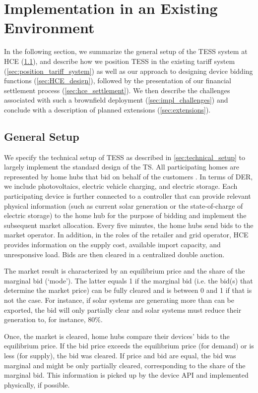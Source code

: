 \section{Implementation in an Existing Environment}\label{sec:challenges}

In the following section, we summarize the general setup of the TESS system at HCE (\cref{sec:hce_market_setup}), and describe how we position TESS in the existing tariff system (\cref{sec:position_tariff_system}) as well as our approach to designing device bidding functions (\cref{sec:HCE_design}), followed by the presentation of our financial settlement process (\cref{sec:hce_settlement}). We then describe the challenges associated with such a brownfield deployment (\cref{sec:impl_challenges}) and conclude with a description of planned extensions (\cref{sec:extensions}).

\subsection{General Setup}\label{sec:hce_market_setup}

We specify the technical setup of TESS as described in \cref{sec:technical_setup} to largely implement the standard design of the TS. All participating homes are represented by home hubs that bid on behalf of the customers \citep{powernet2021}. In terms of DER, we include photovoltaics, electric vehicle charging, and electric storage. Each participating device is further connected to a controller that can provide relevant physical information (such as current solar generation or the state-of-charge of electric storage) to the home hub for the purpose of bidding and implement the subsequent market allocation. Every five minutes, the home hubs send bids to the market operator. In addition, in the roles of the retailer and grid operator, HCE provides information on the supply cost, available import capacity, and unresponsive load. Bids are then cleared in a centralized double auction. 

The market result is characterized by an equilibrium price and the share of the marginal bid (`mode'). The latter equals 1 if the marginal bid (i.e. the bid(s) that determine the market price) can be fully cleared and is between 0 and 1 if that is not the case. For instance, if solar systems are generating more than can be exported, the bid will only partially clear and solar systems must reduce their generation to, for instance, 80\%.

Once, the market is cleared, home hubs compare their devices' bids to the equilibrium price. If the bid price exceeds the equilibrium price (for demand) or is less (for supply), the bid was cleared. 
If price and bid are equal, the bid was marginal and might be only partially cleared, corresponding to the share of the marginal bid.
This information is picked up by the device API and implemented physically, if possible.

